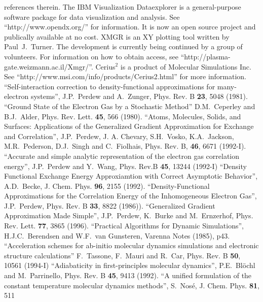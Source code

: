 \documentclass[final,12pt]{article}
\begin{document}
\begin{thebibliography}{99}
  references therein.
 The IBM Visualization Dataexplorer is a
  general-purpose software package for data visualization and
  analysis. See ``http://www.opendx.org/'' for information. It is now
  an open source project and publically available at no cost.
XMGR is an XY plotting tool written by 
  Paul~J.~Turner. The development is currently being continued by a group of
  volunteers.  For information on how to obtain access, see
  ``http://plasma-gate.weizmann.ac.il/Xmgr/''.
 Cerius$^2$ is a product of Molecular Simulations
  Inc. See ``http://www.msi.com/info/products/Cerius2.html'' for more
  information.
 ``Self-interaction correction to
  density-functional approximations for many-electron
  systems'', J.P.~Perdew and A.~Zunger, Phys. Rev. B {\bf 23}, 5048 (1981).
 ``Ground State of the Electron Gas by a
  Stochastic Method'' D.M.~Ceperley and B.J.~Alder, Phys. Rev.
  Lett. {\bf 45}, 566 (1980).
``Atoms, Molecules, Solids, and Surfaces: Applications
  of the Generalized Gradient Approximation for Exchange and
  Correlation'', J.P.~Perdew, J. A. Chevary, S.H.~Vosko, K.A.~Jackson,
  M.R.~Pederson, D.J.~Singh and C.~Fiolhais, Phys. Rev. B, {\bf 46},
  6671 (1992-I).
 ``Accurate and simple analytic representation of the
  electron gas correlation energy'', J.P.~Perdew and Y.~Wang,
  Phys. Rev.B {\bf 45}, 13244 (1992-I)
``Density Functional Exchange Energy Approxiamtion
  with Correct Asymptotic Behavior'', A.D.~Becke, J. Chem. Phys.{\bf
    96}, 2155 (1992).
 ``Density-Functional Approximations for the
  Correlation Energy of the Inhomogeneous Electron Gas'', J.P.~Perdew,
  Phys. Rev. B {\bf 33}, 8822 (1986)).
``Generalized Gradient Approximation Made Simple'',
  J.P.~Perdew, K.~Burke and M.~Ernzerhof, Phys. Rev. Lett. {\bf 77},
  3865 (1996).
``Practical Algorithms for Dynamic Simulations'',
  H.J.C.~Berendsen and W.F.~van Gunsteren, Varenna Notes (1985), p43.
``Acceleration schemes for ab-initio molecular
  dynamics simulations and electronic structure calculations''
  F.~Tassone, F.~Mauri and R.~Car, Phys. Rev. B {\bf 50}, 10561
  (1994-I)
``Adiabaticity in first-principles molecular
  dynamics'', P.E.~Bl\"ochl and M.~Parrinello, Phys. Rev. B {\bf 45},
  9413 (1992).
``A unified formulation of the constant temperature
  molecular dynamics methods'', S.~Nos\'e, J. Chem. Phys. {\bf 81}, 511

\end{thebibliography}
\end{document}
